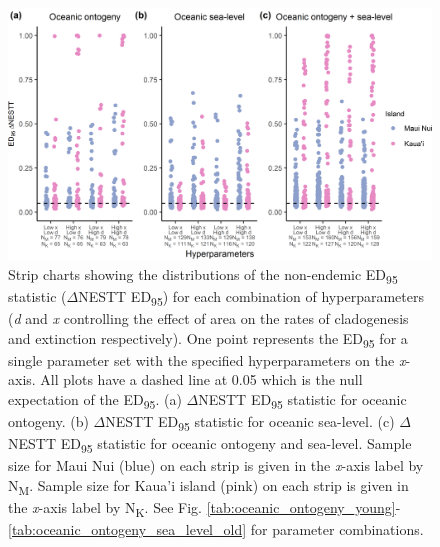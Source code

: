 \begin{figure}
    \centering
    \includegraphics{Hyperparameters_nonendemic.png}
    \caption{Strip charts showing the distributions of the non-endemic ED\textsubscript{95} statistic ($\Delta$NESTT ED\textsubscript{95}) for each combination of hyperparameters (\textit{d} and \textit{x} controlling the effect of area on the rates of cladogenesis and extinction respectively). One point represents the ED\textsubscript{95} for a single parameter set with the specified hyperparameters on the \textit{x}-axis. All plots have a dashed line at 0.05 which is the null expectation of the ED\textsubscript{95}. (a) $\Delta$NESTT ED\textsubscript{95} statistic for oceanic ontogeny. (b) $\Delta$NESTT ED\textsubscript{95} statistic for oceanic sea-level. (c) $\Delta$NESTT ED\textsubscript{95} statistic for oceanic ontogeny and sea-level. Sample size for Maui Nui (blue) on each strip is given in the \textit{x}-axis label by N\textsubscript{M}. Sample size for Kaua'i island (pink) on each strip is given in the \textit{x}-axis label by N\textsubscript{K}. See Fig. \ref{tab:oceanic_ontogeny_young}-\ref{tab:oceanic_ontogeny_sea_level_old} for parameter combinations.}
    \label{fig:Hyperparameters_nonendemic}
\end{figure}
 
